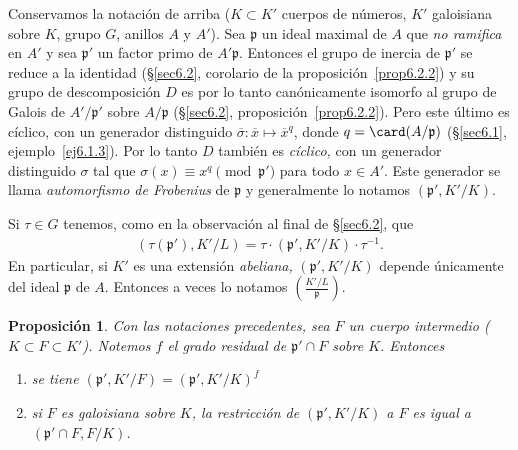 \documentclass[bibtotoc,leqno,spanish]{amsbook}
\newcommand{\idl}[1]{\mathfrak{#1}}
\newcommand{\oline}[1]{\overline{#1}}
\numberwithin{equation}{section}
\theoremstyle{note}
\theoremstyle{note}
\newtheorem{proposition}{Proposici\'on}
\theoremstyle{rem}
\numberwithin{theorem}{section}
\numberwithin{proposition}{section}
\numberwithin{definition}{section}
\numberwithin{lemma}{section}
\numberwithin{corollary}{section}
\numberwithin{example}{section}
\numberwithin{footnote}{section}%
\begin{document}
Conservamos la notaci\'on de arriba ($K\subset K'$ cuerpos de n\'umeros, $K'$ galoisiana sobre $K$, grupo $G$,
anillos $A$ y $A'$). Sea $\idl{p}$ un ideal maximal de $A$ que {\em no ramifica} en $A'$ y sea $\idl{p}'$ un
factor primo de $A'\idl{p}$. Entonces el grupo de inercia de $\idl{p}'$ se reduce a la identidad
(\S\ref{sec6.2}, corolario de la proposici\'on~\ref{prop6.2.2})
y su grupo de descomposici\'on $D$ es por lo tanto can\'onicamente isomorfo al
grupo de Galois de $A'/\idl{p}'$ sobre $A/\idl{p}$ (\S\ref{sec6.2}, proposici\'on~\ref{prop6.2.2}).
Pero este \'ultimo es c\'iclico, con un
generador distinguido $\oline\sigma:\oline x\mapsto\oline x^{q}$, donde $q = \card(A/\idl{p})$
(\S\ref{sec6.1}, ejemplo~\ref{ej6.1.3}). Por lo tanto $D$ tambi\'en es {\em c\'iclico,} con un generador distinguido $\sigma$ tal
que $\sigma(x) \equiv x^{q}\pmod{\idl{p}'}$ para todo $x\in A'$. Este generador se llama {\em automorfismo de
Frobenius} de $\idl{p}$ y generalmente lo notamos $(\idl{p}',K'/K)$.

Si $\tau\in G$ tenemos, como en la observaci\'on al final de \S\ref{sec6.2}, que
\begin{gather}
(\tau(\idl{p}'),K'/L) = \tau\cdot(\idl{p}',K'/K)\cdot\tau^{-1}.
\end{gather}
En particular, si $K'$ es una extensi\'on {\em abeliana,} $(\idl{p'},K'/K)$ depende \'unicamente del
ideal $\idl{p}$ de $A$. Entonces a veces lo notamos $\left(\frac{K'/L}{\idl{p}}\right)$.

\begin{proposition}\label{prop6.3.1}
Con las notaciones precedentes, sea $F$ un cuerpo intermedio {\upshape(}$K\subset F\subset K'${\upshape).}
Notemos $f$ el grado residual de $\idl{p}'\cap F$ sobre $K$. Entonces
\begin{enumerate}
\item se tiene $(\idl{p}',K'/F) = (\idl{p}',K'/K)^{f}$
\item si $F$ es galoisiana sobre $K$, la restricci\'on de $(\idl{p}',K'/K)$ a $F$ es igual a
$(\idl{p}'\cap F,F/K)$.
\end{enumerate}
\end{proposition}
\end{document}
